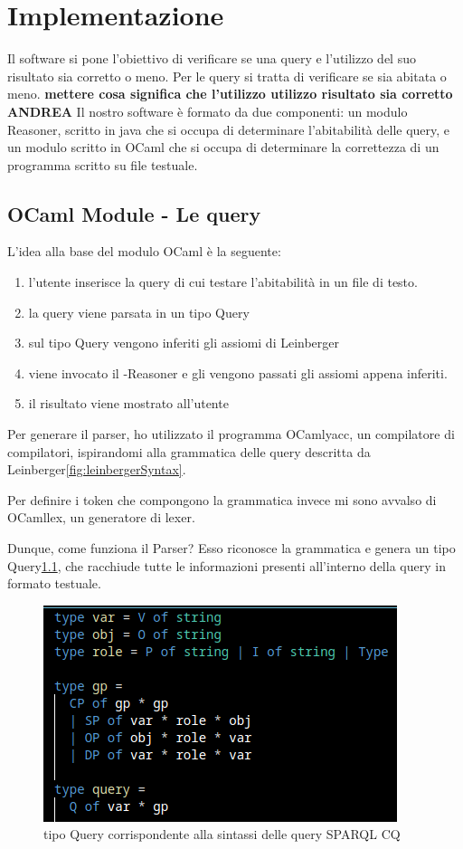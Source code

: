 \chapter[Implementazione]{Implementazione}
Il software si pone l'obiettivo di verificare se una query e l'utilizzo del suo risultato sia corretto o meno. Per le query si tratta di verificare se sia abitata o meno. \textbf{mettere cosa significa che l'utilizzo utilizzo risultato sia corretto ANDREA} Il nostro software è formato da due componenti: un modulo Reasoner, scritto in java che si occupa di determinare l'abitabilità delle query, e un modulo scritto in OCaml che si occupa di determinare la correttezza di un programma scritto su file testuale.


\section{OCaml Module - Le query}
L'idea alla base del modulo OCaml è la seguente:
\begin{enumerate}
    \item l'utente inserisce la query di cui testare l'abitabilità in un file di testo.
    \item la query viene parsata in un tipo Query
    \item sul tipo Query vengono inferiti gli assiomi di Leinberger
    \item viene invocato il -Reasoner e gli vengono passati gli assiomi appena inferiti.
    \item il risultato viene mostrato all'utente
\end{enumerate}

Per generare il parser, ho utilizzato il programma OCamlyacc, un compilatore di compilatori, ispirandomi alla grammatica delle query descritta da Leinberger\ref{fig:leinbergerSyntax}. 

Per definire i token che compongono la grammatica invece mi sono avvalso di OCamllex, un generatore di lexer.


Dunque, come funziona il Parser? Esso riconosce la grammatica e genera un tipo Query\ref{fig:querType}, che racchiude tutte le informazioni presenti all'interno della query in formato testuale. 

\begin{figure}[H]
    \centering
    \includegraphics[scale=0.7]{pictures/queryType.png}
    \caption{tipo Query corrispondente alla sintassi delle query SPARQL CQ}
    \label{fig:querType}
\end{figure}


